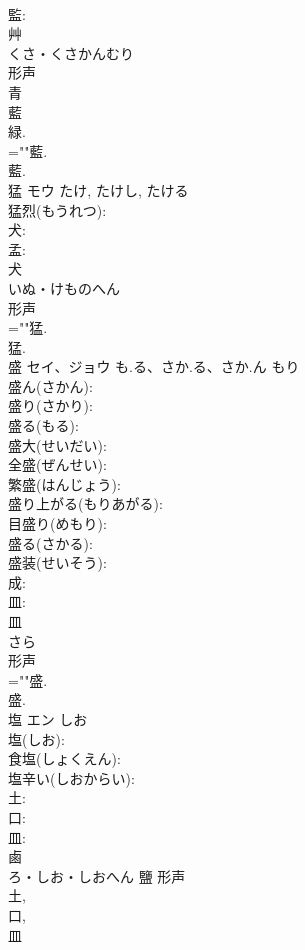 \documentclass[8pt]{extreport}
\begin{document}
\begin{CJK}{UTF8}{min}
\\	監: 
\\	艸	
\\	くさ・くさかんむり	
\\	形声 
\\	青 
\\	藍 
\\	緑. 
\\	=""藍.
\\	藍.
\\	猛	モウ		たけ, たけし, たける	
\\	猛烈(もうれつ): 
\\	犬: 
\\	孟: 
\\	犬	
\\	いぬ・けものへん	
\\	形声 
\\	=""猛.
\\	猛.
\\	盛	セイ、ジョウ	も.る、さか.る、さか.ん	もり	
\\	盛ん(さかん): 
\\	盛り(さかり): 
\\	盛る(もる): 
\\	盛大(せいだい): 
\\	全盛(ぜんせい): 
\\	繁盛(はんじょう): 
\\	盛り上がる(もりあがる): 
\\	目盛り(めもり): 
\\	盛る(さかる): 
\\	盛装(せいそう): 
\\	成: 
\\	皿: 
\\	皿	
\\	さら	
\\	形声 
\\	=""盛.
\\	盛.
\\	塩	エン	しお		
\\	塩(しお): 
\\	食塩(しょくえん): 
\\	塩辛い(しおからい): 
\\	土: 
\\	口: 
\\	皿: 
\\	鹵	
\\	ろ・しお・しおへん	鹽	形声 
\\	土, 
\\	口, 
\\	皿 

\end{CJK}
\end{document}

